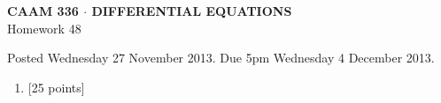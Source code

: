 \documentclass[10pt]{article}
\begin{document}
\vspace*{-5em}
\begin{center}
\large \textsf{\textbf{CAAM 336 $\cdot$ DIFFERENTIAL EQUATIONS}\\[0.5em]
Homework 48 }
\end{center}

Posted Wednesday 27 November 2013.  Due 5pm Wednesday 4 December 2013.

\begin{enumerate}\addtocounter{enumi}{47}
\item {[25 points]}  
\end{enumerate}
\end{document}

